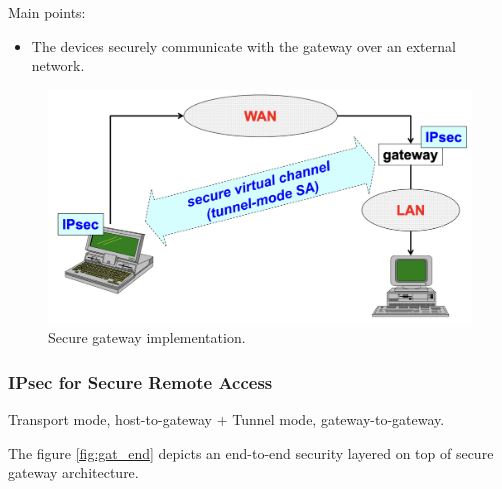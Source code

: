 \begin{multicols}{2}
\raggedcolumns
    Main points:
    \begin{itemize}
        \item The devices securely communicate with the gateway over an external network.
    \end{itemize}
\columnbreak

\begin{figure}[H]
    \centering
  \includegraphics[width=\linewidth]{Images/NetSec/secure_gateway.png}
  \caption{Secure gateway implementation.}
  \label{fig:secgat}
\end{figure}

\end{multicols}

\subsubsection{IPsec for Secure Remote Access}
\begin{center}
    Transport mode, host-to-gateway + Tunnel mode, gateway-to-gateway.
\end{center}

The figure \ref{fig:gat_end} depicts an end-to-end security layered on top of secure gateway architecture. 



